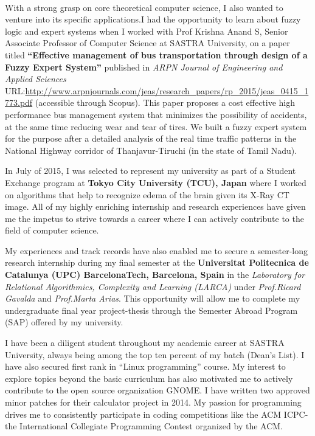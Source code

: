 \documentclass[11pt]{article}
\begin{document}
\\\par
With a strong grasp on core theoretical computer science, I also wanted to venture into its specific applications.I had the opportunity to learn about fuzzy logic and expert systems when I worked with Prof Krishna Anand S, Senior Associate Professor of Computer Science at SASTRA University, on a paper titled \textbf{``Effective management of bus transportation through design of a Fuzzy Expert System''} published in \emph{ARPN Journal of Engineering and Applied Sciences} URL:\url{http://www.arpnjournals.com/jeas/research_papers/rp_2015/jeas_0415_1773.pdf}
(accessible through Scopus). This paper proposes a cost effective high performance bus management system that minimizes the possibility of accidents, at the same time reducing wear and tear of tires. We built a fuzzy expert system for the purpose after a detailed analysis of the real time traffic patterns in the National Highway corridor of Thanjavur-Tiruchi (in the state of Tamil Nadu).
\\\par
In July of 2015, I was selected to represent my university as part of a Student Exchange program at \textbf{Tokyo City University (TCU), Japan} where I worked on algorithms that help to recognize edema of the brain given its X-Ray CT image. All of my highly enriching internship and research experiences have given me the impetus to strive towards a career where I can actively contribute to the field of computer science.
\\\par
My experiences and track records have also enabled me to secure a semester-long research internship during my final semester at the \textbf{Universitat Politecnica de Catalunya (UPC) BarcelonaTech, Barcelona, Spain} in the \emph{Laboratory for Relational Algorithmics, Complexity and Learning (LARCA)} under \emph{Prof.Ricard Gavalda} and \emph{Prof.Marta Arias}. This opportunity will allow me to complete my undergraduate final year project-thesis through the Semester Abroad Program (SAP) offered by my university. 
\\\par
I have been a diligent student throughout my academic career at SASTRA University, always being among the top ten percent of my batch (Dean's List). I have also secured first rank in ``Linux programming'' course.  My interest to explore topics beyond the basic curriculum has also motivated me to actively contribute to the open source organization GNOME. I have written two approved minor patches for their calculator project in 2014. My passion for programming drives me to consistently participate in coding competitions like the ACM ICPC- the International Collegiate Programming Contest organized by the ACM. 
\end{document}
